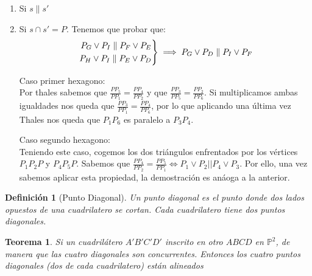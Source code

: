 \documentclass[11pt, a4paper]{article}
\makeatletter
\newif\IfInSansMode
\let\oldsf\sffamily
\renewcommand*{\sffamily}{\oldsf\mathversion{sans}\InSansModetrue}
\let\oldnorm\normalfont
\renewcommand*{\normalfont}{\oldnorm\InSansModefalse\mathversion{normal}}
\renewenvironment{proof}[1][\proofname] {\vspace{-15pt}\par\pushQED{\qed}\normalfont\topsep6\p@\@plus6\p@\relax\trivlist\item[\hskip\labelsep\it#1\@addpunct{.}]\ignorespaces}{\popQED\endtrivlist\@endpefalse}
\renewenvironment{proof}[1][\proofname] {\par\pushQED{\qed}\normalfont\topsep6\p@\@plus6\p@\relax\trivlist\item[\hskip\labelsep\itshape\sffamily#1\@addpunct{.}]\ignorespaces}{\popQED\endtrivlist\@endpefalse}
\theoremstyle{theorem-style}
\newtheorem{nth}{Teorema}[section]
\theoremstyle{definition-style}
\newtheorem{ndef}{Definición}[section]
\theoremstyle{remark-style}
\theoremstyle{example-style}
\newenvironment{nlist}
{\begin{enumerate}
    \renewcommand\labelenumi{(\emph{\roman{enumi})}}}
  {\end{enumerate}}
\newenvironment{rcases}
{\left.\begin{aligned}}
    {\end{aligned}\right\rbrace}
\makeatother
\begin{document}
\begin{proof}[Demostración de la versión afín]\hfill
\begin{nlist}
	\item Si $s \parallel s'$ %
	\item Si $s\cap s' = P$. Tenemos que probar que:
	$$\begin{rcases}
	P_G\vee P_I \parallel P_F \vee P_E\\
	P_H\vee P_I \parallel P_E \vee P_D
\end{rcases}\implies P_G \vee P_D \parallel P_I \vee P_F $$

Caso primer hexagono:\\ %
Por thales sabemos que $\frac{PP_5}{PP_1}=\frac{PP_4}{PP_2}$ y que $\frac{PP_3}{PP_5}=\frac{PP_2}{PP_6}$. Si multiplicamos ambas igualdades nos queda que $\frac{PP_3}{PP_1} = \frac{PP_4}{PP_6}$, por lo que aplicando una última vez Thales nos queda que $P_1 P_6$ es paralelo a $P_3 P_4$.

Caso segundo hexagono:\\
Teniendo este caso, cogemos los dos triángulos enfrentados por los vértices $P_1P_2P$ y $P_4P_5P$.  Sabemos %
que $\frac{PP_4}{PP_2} = \frac{PP_5}{PP_1} \iff P_1\vee P_2 || P_4\vee P_3$. Por ello, una vez sabemos aplicar esta propiedad, la demostración es anáoga a la anterior.

\end{nlist}
\end{proof}



\begin{ndef}[Punto Diagonal]
	Un punto diagonal es el punto donde dos lados opuestos de una cuadrilatero se cortan. Cada cuadrilatero tiene dos puntos diagonales.
\end{ndef}

\begin{nth}
	Si un cuadrilátero $A'B'C'D'$ inscrito en otro $ABCD$ en $\mathbb{P}^2$, de manera que las cuatro diagonales son concurrentes. Entonces los cuatro puntos diagonales  (dos de cada cuadrilatero) están alineados
\end{nth} 
\end{document}
